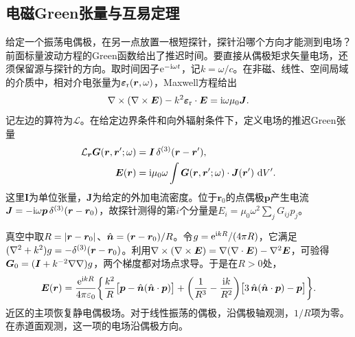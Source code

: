 \subsection{电磁Green张量与互易定理}
\label{sec:dyadic-green}
给定一个振荡电偶极，在另一点放置一根短探针，探针沿哪个方向才能测到电场？前面标量波动方程的Green函数给出了推迟时间。要直接从偶极矩求矢量电场，还须保留源与探针的方向。取时间因子$\mathop{}\!\mathrm{e}^{-\mathrm{i}\omega t}$，记$k = \omega/c$。在非磁、线性、空间局域的介质中，相对介电张量为$\bm\varepsilon_\mathrm r(\bm r,\omega)$，Maxwell方程给出
\begin{equation}
    \label{eq:ed-electric-wave-operator}
    \nabla\times(\nabla\times\bm E) - k^2\bm\varepsilon_\mathrm r \cdot \bm E = \mathrm{i}\omega\mu_0\bm J .
\end{equation}
记左边的算符为$\mathcal L$。在给定边界条件和向外辐射条件下，定义电场的推迟Green张量
\begin{subequations}\label{eqn:electric dyadic green}
    \begin{align}
        \mathcal L_{\bm r}\bm G(\bm r,\bm r';\omega) &=
        \bm I\,\delta^{(3)}(\bm r - \bm r'),\\
        \bm E(\bm r) &= \mathrm{i}\mu_0\omega\int\bm G(\bm r,\bm r';\omega) \cdot \bm J(\bm r')\,\mathop{}\!\mathrm{d} V'.
    \end{align}
\end{subequations}
这里$\bm I$为单位张量，$\bm J$为给定的外加电流密度。位于$\bm r_0$的点偶极$\bm p$产生电流$\bm J = -\mathrm{i}\omega\bm p\,\delta^{(3)}(\bm r - \bm r_0)$，故探针测得的第$i$个分量是$\textstyle E_i = \mu_0\omega^2\sum_j G_{ij}p_j$。

真空中取$R = \lvert\bm r - \bm r_0\rvert$、$\mathop{}\!\hat{\bm{n}} = (\bm r - \bm r_0)/R$。令$g = \mathop{}\!\mathrm{e}^{\mathrm{i} kR}/(4\pi R)$，它满足$(\nabla^2 + k^2)g = -\delta^{(3)}(\bm r - \bm r_0)$。利用$\nabla\times(\nabla\times\bm E) = \nabla(\nabla\cdot\bm E) - \nabla^2\bm E$，可验得$\bm G_0 = (\bm I + k^{-2}\nabla\nabla)g$，两个梯度都对场点求导。于是在$R > 0$处，
\begin{equation}
    \bm E(\bm r) = \frac{\mathop{}\!\mathrm{e}^{\mathrm{i} kR}}{4\pi\varepsilon_0}
    \biggl\{\frac{k^2}{R}\bigl[\bm p - \mathop{}\!\hat{\bm{n}}(\mathop{}\!\hat{\bm{n}} \cdot \bm p)\bigr]
    + \biggl(\frac{1}{R^3} - \frac{\mathrm{i} k}{R^2}\biggr)
    \bigl[3\mathop{}\!\hat{\bm{n}}(\mathop{}\!\hat{\bm{n}} \cdot \bm p) - \bm p\bigr]\biggr\}.
    \label{eqn:dyadic dipole field}
\end{equation}
近区的主项恢复静电偶极场。对于线性振荡的偶极，沿偶极轴观测，$1/R$项为零。在赤道面观测，这一项的电场沿偶极方向。

